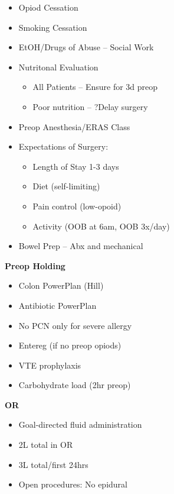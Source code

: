\documentclass[
]{book}
\providecommand{\tightlist}{%
  \setlength{\itemsep}{0pt}\setlength{\parskip}{0pt}}
\begin{document}
\begin{itemize}
\tightlist
\item
  Opiod Cessation
\item
  Smoking Cessation
\item
  EtOH/Drugs of Abuse -- Social Work
\item
  Nutritonal Evaluation

  \begin{itemize}
  \tightlist
  \item
    All Patients -- Ensure for 3d preop
  \item
    Poor nutrition -- ?Delay surgery
  \end{itemize}
\item
  Preop Anesthesia/ERAS Class
\item
  Expectations of Surgery:

  \begin{itemize}
  \tightlist
  \item
    Length of Stay 1-3 days
  \item
    Diet (self-limiting)
  \item
    Pain control (low-opoid)
  \item
    Activity (OOB at 6am, OOB 3x/day)
  \end{itemize}
\item
  Bowel Prep -- Abx and mechanical
\end{itemize}

\textbf{Preop Holding}

\begin{itemize}
\tightlist
\item
  Colon PowerPlan (Hill)
\item
  Antibiotic PowerPlan
\item
  No PCN only for severe allergy
\item
  Entereg (if no preop opiods)
\item
  VTE prophylaxis
\item
  Carbohydrate load (2hr preop)
\end{itemize}

\textbf{OR}

\begin{itemize}
\tightlist
\item
  Goal-directed fluid administration
\item
  2L total in OR
\item
  3L total/first 24hrs
\item
  Open procedures: No epidural
\end{itemize}
\end{document}
